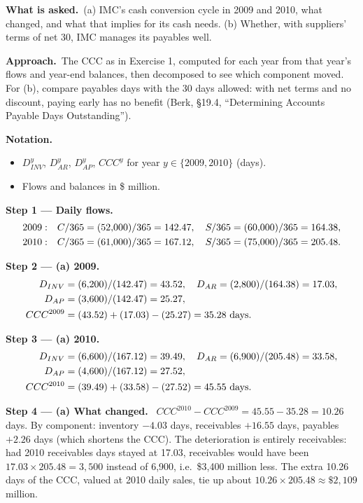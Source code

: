 \documentclass[11pt,a4paper]{article}
\newcommand{\notation}{\par\noindent\textbf{Notation.}}
\newcommand{\step}[2]{\par\medskip\noindent\textbf{Step #1 --- #2.}~}
\newcommand{\asked}{\par\medskip\noindent\textbf{What is asked.}~}
\newcommand{\approach}{\par\smallskip\noindent\textbf{Approach.}~}
\begin{document}
\asked (a) IMC's cash conversion cycle in 2009 and 2010, what changed, and what that implies for
its cash needs. (b) Whether, with suppliers' terms of net 30, IMC manages its payables well.

\approach The CCC as in Exercise 1, computed for each year from that year's flows and year-end
balances, then decomposed to see which component moved. For (b), compare payables days with the
30 days allowed: with net terms and no discount, paying early has no benefit (Berk, \S19.4,
``Determining Accounts Payable Days Outstanding'').

\notation
\begin{itemize}
  \item $D_{INV}^{y}$, $D_{AR}^{y}$, $D_{AP}^{y}$, $CCC^{y}$ for year $y \in \{2009, 2010\}$ (days).
  \item Flows and balances in \$ million.
\end{itemize}

\step{1}{Daily flows}
\begin{align}
  2009:&\quad C/365 = (52{,}000)/365 = 142.47, \quad S/365 = (60{,}000)/365 = 164.38, \notag\\
  2010:&\quad C/365 = (61{,}000)/365 = 167.12, \quad S/365 = (75{,}000)/365 = 205.48. \notag
\end{align}

\step{2}{(a) 2009}
\begin{align}
  D_{INV} &= (6{,}200)/(142.47) = 43.52, \quad D_{AR} = (2{,}800)/(164.38) = 17.03, \notag\\
  D_{AP} &= (3{,}600)/(142.47) = 25.27, \notag\\
  CCC^{2009} &= (43.52) + (17.03) - (25.27) = 35.28 \ \text{days}. \label{r5be13-09}
\end{align}

\step{3}{(a) 2010}
\begin{align}
  D_{INV} &= (6{,}600)/(167.12) = 39.49, \quad D_{AR} = (6{,}900)/(205.48) = 33.58, \notag\\
  D_{AP} &= (4{,}600)/(167.12) = 27.52, \notag\\
  CCC^{2010} &= (39.49) + (33.58) - (27.52) = 45.55 \ \text{days}. \label{r5be13-10}
\end{align}

\step{4}{(a) What changed}
$CCC^{2010} - CCC^{2009} = 45.55 - 35.28 = 10.26$ days. By component: inventory $-4.03$ days,
receivables $+16.55$ days, payables $+2.26$ days (which shortens the CCC). The deterioration is
entirely receivables: had 2010 receivables days stayed at 17.03, receivables would have been
$17.03 \times 205.48 = 3{,}500$ instead of 6{,}900, i.e.\ \$3{,}400 million less. The extra
10.26 days of the CCC, valued at 2010 daily sales, tie up about $10.26 \times 205.48 \approx
\$2{,}109$ million.
\end{document}
